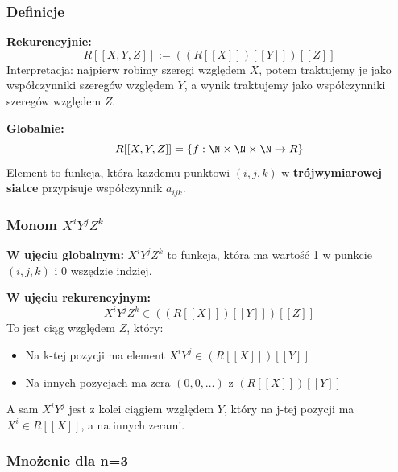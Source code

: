 \subsubsection{Definicje}

\textbf{Rekurencyjnie:}
\[
R[[X,Y,Z]] := ((R[[X]])[[Y]])[[Z]]
\]
Interpretacja: najpierw robimy szeregi względem $X$, potem traktujemy je jako współczynniki szeregów względem $Y$, a wynik traktujemy jako współczynniki szeregów względem $Z$.

\textbf{Globalnie:}
\[
R[[X,Y,Z]] = \left\{ f: \N \times \N \times \N \to R \right\}
\]
Element to funkcja, która każdemu punktowi $(i,j,k)$ w \textbf{trójwymiarowej siatce} przypisuje współczynnik $a_{ijk}$.

\subsubsection{Monom $X^iY^jZ^k$}

\begin{center}
\end{center}

\textbf{W ujęciu globalnym:} $X^iY^jZ^k$ to funkcja, która ma wartość 1 w punkcie $(i,j,k)$ i 0 wszędzie indziej.

\textbf{W ujęciu rekurencyjnym:} 
\[
X^iY^jZ^k \in ((R[[X]])[[Y]])[[Z]]
\]
To jest ciąg względem $Z$, który:
\begin{itemize}
\item Na k-tej pozycji ma element $X^iY^j \in (R[[X]])[[Y]]$
\item Na innych pozycjach ma zera $(0,0,\dots)$ z $(R[[X]])[[Y]]$
\end{itemize}
A sam $X^iY^j$ jest z kolei ciągiem względem $Y$, który na j-tej pozycji ma $X^i \in R[[X]]$, a na innych zerami.

\subsubsection{Mnożenie dla n=3}

